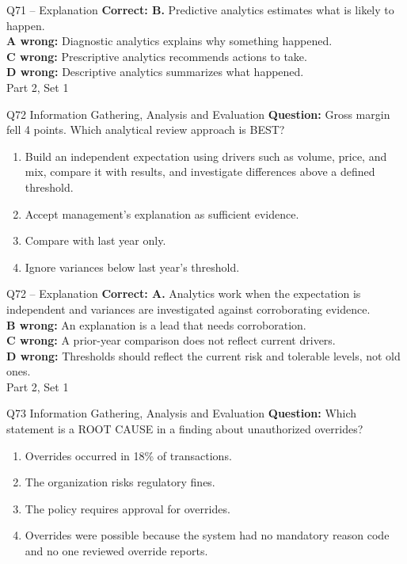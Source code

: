 \documentclass[aspectratio=169,10pt]{beamer}
\begin{document}
\begin{frame}[t]{Q71 -- Explanation}
	\footnotesize
	\textbf{Correct: B.} Predictive analytics estimates what is likely to happen. \\[5pt]
\textbf{A wrong:} Diagnostic analytics explains why something happened. \\[3pt]
\textbf{C wrong:} Prescriptive analytics recommends actions to take. \\[3pt]
\textbf{D wrong:} Descriptive analytics summarizes what happened. \\[3pt]
	\vfill {\tiny Part 2, Set 1}
\end{frame}
\begin{frame}[t]{Q72 \hfill {\scriptsize Information Gathering, Analysis and Evaluation}}
	\small
	\textbf{Question:} Gross margin fell 4 points. Which analytical review approach is BEST?
	\begin{enumerate}[label=\Alph*.,itemsep=1pt,topsep=3pt]
			\item Build an independent expectation using drivers such as volume, price, and mix, compare it with results, and investigate differences above a defined threshold.
			\item Accept management's explanation as sufficient evidence.
			\item Compare with last year only.
			\item Ignore variances below last year's threshold.
	\end{enumerate}
\end{frame}
\begin{frame}[t]{Q72 -- Explanation}
	\footnotesize
	\textbf{Correct: A.} Analytics work when the expectation is independent and variances are investigated against corroborating evidence. \\[5pt]
\textbf{B wrong:} An explanation is a lead that needs corroboration. \\[3pt]
\textbf{C wrong:} A prior-year comparison does not reflect current drivers. \\[3pt]
\textbf{D wrong:} Thresholds should reflect the current risk and tolerable levels, not old ones. \\[3pt]
	\vfill {\tiny Part 2, Set 1}
\end{frame}
\begin{frame}[t]{Q73 \hfill {\scriptsize Information Gathering, Analysis and Evaluation}}
	\small
	\textbf{Question:} Which statement is a ROOT CAUSE in a finding about unauthorized overrides?
	\begin{enumerate}[label=\Alph*.,itemsep=1pt,topsep=3pt]
			\item Overrides occurred in 18\% of transactions.
			\item The organization risks regulatory fines.
			\item The policy requires approval for overrides.
			\item Overrides were possible because the system had no mandatory reason code and no one reviewed override reports.
	\end{enumerate}
\end{frame}
\end{document}
